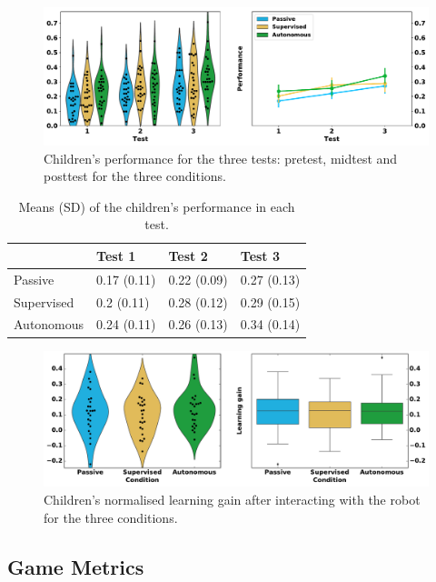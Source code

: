 \begin{figure}[ht]
	\includegraphics[width=1\linewidth]{perf.pdf}
	\centering
	\caption{Children's performance for the three tests: pretest, midtest and posttest for the three conditions.}
	\label{fig:tutoring_performance}
\end{figure}

\begin{table}[ht]
	\centering
	\caption{Means (SD) of the children's performance in each test.}
	\label{tab:tuto_results_perf}
	\begin{tabularx}{\textwidth}{@{}L{1.}L{1}L{1}L{1}@{}}\toprule
		& Test 1 & Test 2 & Test 3\\ 
		\midrule 
		Passive & 0.17 (0.11) & 0.22 (0.09) & 0.27 (0.13)\\ 
		Supervised & 0.2 (0.11) & 0.28 (0.12) & 0.29 (0.15)\\ 
		Autonomous & 0.24 (0.11) & 0.26 (0.13) & 0.34 (0.14)\\ 
		
		\bottomrule
	\end{tabularx}
\end{table}

\begin{figure}[ht]
	\includegraphics[width=1\linewidth]{learning.pdf}
	\centering
	\caption{Children's normalised learning gain after interacting with the robot for the three conditions.}
	\label{fig:tutoring_learning}
\end{figure}

\subsection{Game Metrics}

